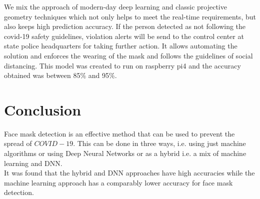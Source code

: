 \documentclass[12pt,a4paper]{article}
\begin{document}
We mix the approach of modern-day deep learning and classic projective geometry techniques which not only helps to meet the real-time requirements, but also keeps high prediction accuracy. If the person detected as not following the covid-19 safety 
guidelines, violation alerts will be send to the control center at state police headquarters for taking further action. It allows 
automating the solution and enforces the wearing of the mask and follows the guidelines of social distancing. This model was created to run on raspberry pi4 and the accuracy obtained was between 85\% and 95\%.
\section*{Conclusion}
Face mask detection is an effective method that can be used to prevent the spread of $COVID-19$. This can be done in three ways, i.e. using just machine algorithms or using Deep Neural Networks or as a hybrid i.e. a mix of machine learning and DNN.\\ It was found that the hybrid and DNN approaches have high accuracies while the machine learning approach has a comparably lower accuracy for face mask detection. 
\end{document}
